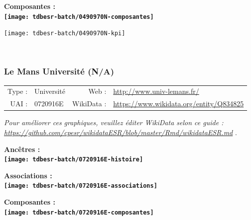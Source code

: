 \documentclass[12pt,french,]{article}
\begin{document}
\hrulefill

\begin{center} \bf Composantes : \\  
\texttt{[image: tdbesr-batch/0490970N-composantes]} \end{center}

\begin{center}\texttt{[image: tdbesr-batch/0490970N-kpi]} \end{center}\checkoddpage

\ifoddpage \fi ~\newpage  

\hypertarget{le-mans-universituxe9-na}{%
\subsubsection{Le Mans Université
(N/A)}\label{le-mans-universituxe9-na}}

\begin{tabular*}{\textwidth}{rp{5cm}rl}  
\hline  
Type : & Université & Web : &\href{http://www.univ-lemans.fr/}{http://www.univ-lemans.fr/} \\  
UAI : & 0720916E & WikiData : & \href{https://www.wikidata.org/entity/Q834825}{https://www.wikidata.org/entity/Q834825} \\  
\hline  
\end{tabular*}

\textit{\scriptsize Pour améliorer ces graphiques, veuillez éditer WikiData selon ce guide :  \href{https://github.com/cpesr/wikidataESR/blob/master/Rmd/wikidataESR.md}{https://github.com/cpesr/wikidataESR/blob/master/Rmd/wikidataESR.md}}
.

\vspace{1cm}  
\begin{minipage}[b]{0.50\textwidth}\begin{center} \bf Ancêtres : \\  
\texttt{[image: tdbesr-batch/0720916E-histoire]} \end{center}\end{minipage}\begin{minipage}[b]{0.50\textwidth}\begin{center} \bf Associations : \\  
\texttt{[image: tdbesr-batch/0720916E-associations]} \end{center}\end{minipage}

\hrulefill

\begin{center} \bf Composantes : \\  
\texttt{[image: tdbesr-batch/0720916E-composantes]} \end{center}
\end{document}
